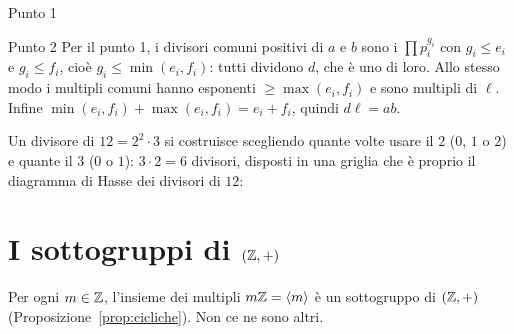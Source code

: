 \begin{concetto}
\begin{dimostrazione}
\begin{caso}{Punto 1}
    \end{caso}
    \begin{caso}{Punto 2}
        Per il punto 1, i divisori comuni positivi di $a$ e $b$ sono i $\prod p_i^{g_i}$ con $g_i \leq e_i$ e $g_i \leq f_i$, cioè $g_i \leq \min(e_i, f_i)$:
        tutti dividono $d$, che è uno di loro. Allo stesso modo i multipli comuni hanno esponenti $\geq \max(e_i, f_i)$ e sono multipli di $\ell$.
        Infine $\min(e_i, f_i) + \max(e_i, f_i) = e_i + f_i$, quindi $d\ell = ab$.
    \end{caso}
\end{dimostrazione}
\end{concetto}

\begin{spiegazione}
    Un divisore di $12 = 2^2 \cdot 3$ si costruisce scegliendo quante volte usare il $2$ ($0$, $1$ o $2$) e quante il $3$ ($0$ o $1$): $3 \cdot 2 = 6$
    divisori, disposti in una griglia che è proprio il diagramma di Hasse dei divisori di $12$:
    \begin{center}
    \end{center}
\end{spiegazione}

\section{I sottogruppi di $(\mathbb{Z}, +)$}\label{sec:sottogruppi-z}

Per ogni $m \in \mathbb{Z}$, l'insieme dei multipli $m\mathbb{Z} = \langle m \rangle$ è un sottogruppo di $(\mathbb{Z}, +)$ (Proposizione~\ref{prop:cicliche}). Non
ce ne sono altri.

